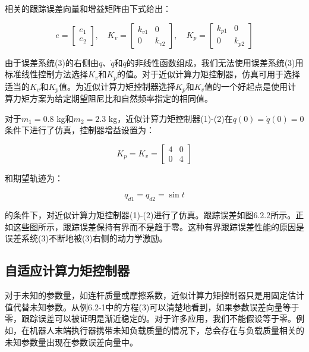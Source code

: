 \documentclass[12pt,a4paper]{ctexart}
\begin{document}
相关的跟踪误差向量和增益矩阵由下式给出：

\begin{equation}
e = \begin{bmatrix} e_1 \\ e_2 \end{bmatrix}, \quad
K_v = \begin{bmatrix} k_{v1} & 0 \\ 0 & k_{v2} \end{bmatrix}, \quad
K_p = \begin{bmatrix} k_{p1} & 0 \\ 0 & k_{p2} \end{bmatrix}
\end{equation}

由于误差系统(3)的右侧由$q$、$\dot{q}$和$\ddot{q}$的非线性函数组成，我们无法使用误差系统(3)用标准线性控制方法选择$K_v$和$K_p$的值。对于近似计算力矩控制器，仿真可用于选择适当的$K_v$和$K_p$值。为近似计算力矩控制器选择$K_p$和$K_v$值的一个好起点是使用计算力矩方案为给定期望阻尼比和自然频率指定的相同值。

对于$m_1 = 0.8$ kg和$m_2 = 2.3$ kg，近似计算力矩控制器(1)-(2)在$q(0)=\dot{q}(0)=0$条件下进行了仿真，控制器增益设置为：

\begin{equation}
K_p = K_v = \begin{bmatrix} 4 & 0 \\ 0 & 4 \end{bmatrix}
\end{equation}

和期望轨迹为：

\begin{equation}
q_{d1} = q_{d2} = \sin t
\end{equation}

的条件下，对近似计算力矩控制器(1)-(2)进行了仿真。跟踪误差如图6.2.2所示。正如这些图所示，跟踪误差保持有界而不是趋于零。这种有界跟踪误差性能的原因是误差系统(3)不断地被(3)右侧的动力学激励。

\subsection*{自适应计算力矩控制器}

对于未知的参数量，如连杆质量或摩擦系数，近似计算力矩控制器只是用固定估计值代替未知参数。从例6.2-1中的方程(3)可以清楚地看到，如果参数误差向量等于零，跟踪误差可以被证明是渐近稳定的。对于许多应用，我们不能假设等于零。例如，在机器人末端执行器携带未知负载质量的情况下，总会存在与负载质量相关的未知参数量出现在参数误差向量中。
\end{document}
